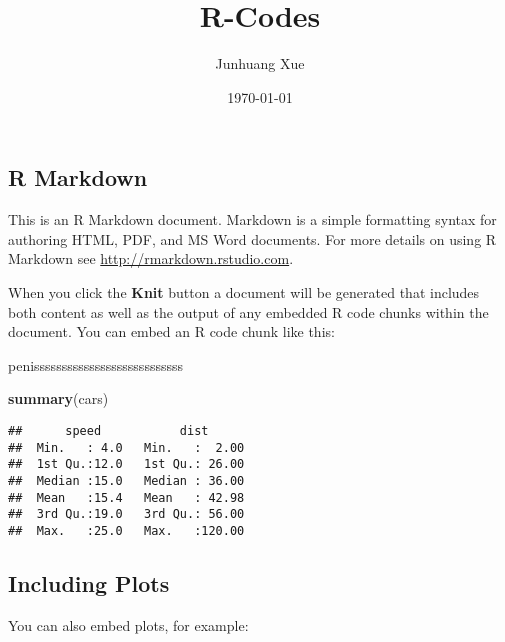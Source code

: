 \documentclass[]{article}
\title{R-Codes}
\author{Junhuang Xue}
\date{\today}
\newenvironment{Shaded}{\begin{snugshade}}{\end{snugshade}}
\newcommand{\KeywordTok}[1]{\textcolor[rgb]{0.13,0.29,0.53}{\textbf{{#1}}}}
\newcommand{\NormalTok}[1]{{#1}}
\begin{document}
\maketitle

\subsection{R Markdown}\label{r-markdown}

This is an R Markdown document. Markdown is a simple formatting syntax
for authoring HTML, PDF, and MS Word documents. For more details on
using R Markdown see \url{http://rmarkdown.rstudio.com}.

When you click the \textbf{Knit} button a document will be generated
that includes both content as well as the output of any embedded R code
chunks within the document. You can embed an R code chunk like this:

penisssssssssssssssssssssssssss

\begin{Shaded}
\begin{Highlighting}[]
\KeywordTok{summary}\NormalTok{(cars)}
\end{Highlighting}
\end{Shaded}

\begin{verbatim}
##      speed           dist       
##  Min.   : 4.0   Min.   :  2.00  
##  1st Qu.:12.0   1st Qu.: 26.00  
##  Median :15.0   Median : 36.00  
##  Mean   :15.4   Mean   : 42.98  
##  3rd Qu.:19.0   3rd Qu.: 56.00  
##  Max.   :25.0   Max.   :120.00
\end{verbatim}

\subsection{Including Plots}\label{including-plots}

You can also embed plots, for example:
\end{document}
